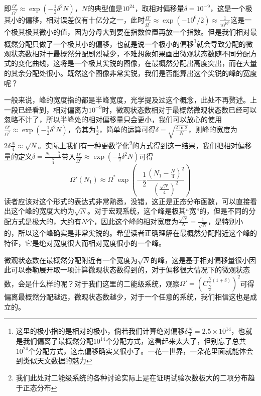 \documentclass[../../main.tex]{subfiles}
\begin{document}
即\(\frac{\Omega'}{\Omega^*}\approx \exp(-\frac{1}{2}\delta^2 N)\)，\(N\)的典型值是\(10^{24}\)，取相对偏移量\(\delta=10^{-9}\)，这是一个极其小的偏移，相对误差仅有十亿分之一，此时\(\displaystyle \frac{\Omega'}{\Omega^*}\approx \exp(-10^6/2)\approx \frac{1}{10^{10^5}}\)这是一个极其极其微小的值，因为分母大到要在指数位置再放一个指数。但是我们相对最概然分配只做了一个极其小的偏移，也就是说一个极小的偏移\footnote{这里的极小指的是相对的极小，倘若我们计算绝对偏移\(\delta\frac{N}{4}=2.5\times10^{14}\)，也就是我们偏离了最概然分配\(10^{14}\)个分配方式，这看起来太大了，但别忘了总共\(10^{24}\)个分配方式，这点偏移确实又很小了。一花一世界，一朵花里面就能体会到类似天文数据的魅力}就会导致分配的微观状态数相对于最概然分配剧烈减少，不难想象如果画出微观状态数随不同分配方式的变化曲线，这将是一个极其尖锐的图像，在最概然分配出高度突出，而在大量的其余分配处很小。既然这个图像非常尖锐，我们是否能算出这个尖锐的峰的宽度呢？

一般来说，峰的宽度指的都是半峰宽度，光学提及过这个概念，此处不再赘述。上一段已经看到，相对偏离为\(10^{-9}\)时，微观状态数相对于最概然微观状态数已经可以忽略不计了，所以半峰处的相对偏移量只会更小，我们可以放心的使用\(\frac{\Omega'}{\Omega^*}\approx \exp(-\frac{1}{2}\delta^2 N)\)，令其为\(\frac{1}{2}\)，简单的运算可得\(\delta=\sqrt{\frac{2\ln 2}{N}}\)，则峰的宽度为\(2\delta\frac{N}{4}\approx \sqrt{N}\)。实际上我们有一种更数学化\footnote{我们此处对二能级系统的各种讨论实际上是在证明试验次数极大的二项分布趋于正态分布}的方式得到这一结果，我们把相对偏移量的定义\(\delta=\frac{N_1-\frac{N}{4}}{\frac{N}{4}}\)带入\(\frac{\Omega'}{\Omega^*}\approx \exp(-\frac{1}{2}\delta^2 N)\)可得
\begin{equation}
    \Omega'(N_1)\approx \Omega^*\exp(-\frac{1}{2}\frac{\left(N_1-\frac{N}{4}\right)^2}{\left(\frac{\sqrt{N}}{4}\right)^2})
\end{equation}
读者应该对这个形式的表达式非常熟悉，没错，这正是正态分布函数，可以直接看出这个峰的宽度大约为\(\sqrt{N}\)。对于宏观系统，这个峰是极其“宽”的，但是不同的分配方式是极大的，大约有\(N\)个，因此这个峰的相对宽度为\(\frac{\sqrt{N}}{N}=\frac{1}{\sqrt{N}}\)，是特别小的，所以这个峰确实是非常尖锐的。希望读者正确理解在最概然分配附近这个峰的特征，它是绝对宽度很大而相对宽度很小的一个峰。

微观状态数在最概然分配附近有一个宽度为\(\sqrt{N}\)的峰，这是基于相对偏移量很小因此可以泰勒展开取一项计算微观状态数得到的，对于偏移很大情况下的微观状态数，会是什么样的呢？对于我们这里的二能级系统，观察\(\Omega'=\left(C_{\frac{N}{2}}^{\frac{N}{4}(1+\delta)}\right)^2\)可得偏离最概然分配越远，微观状态数越少，对于一个任意的系统，我们相信这也是成立的。
\end{document}
